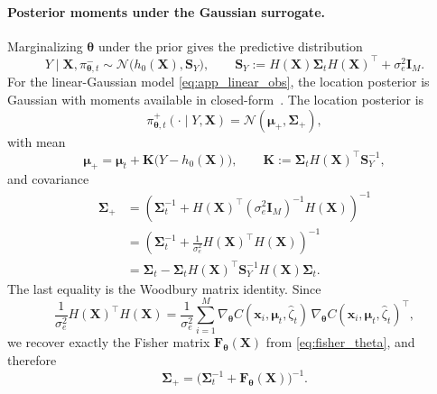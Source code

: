 \documentclass{article}
\newcommand{\bs}[1]{\boldsymbol{#1}}
\newcommand{\x}{\mathbf{x}}
\newcommand{\bX}{\mathbf{X}}
\begin{document}
\paragraph{Posterior moments under the Gaussian surrogate.}
Marginalizing $\bs\theta$ under the prior gives the predictive distribution
\begin{equation}
Y\mid\bX,\pi_{\bs\theta,t}^-
\sim\mathcal N\!\bigl(h_0(\bX),\bs S_Y\bigr),
\qquad
\bs S_Y:=H(\bX)\bs\Sigma_tH(\bX)^\top+\sigma_e^2\bs I_M.
\end{equation}
For the linear-Gaussian model \eqref{eq:app_linear_obs}, the location posterior is Gaussian with moments available in closed-form~\cite{kaipio2005statistical}.
The location posterior is
\begin{equation}
\pi_{\bs\theta,t}^+(\cdot\mid Y,\bX)
=\mathcal N(\bs\mu_+,\bs\Sigma_+),
\end{equation}
with mean
\begin{equation}
\label{eq:app_post_mean}
\bs\mu_+
=\bs\mu_t+\bs K\bigl(Y-h_0(\bX)\bigr),
\qquad
\bs K:=\bs\Sigma_tH(\bX)^\top\bs S_Y^{-1},
\end{equation}
and covariance
\begin{equation}
\label{eq:app_post_cov}
\begin{aligned}
\bs\Sigma_+
&=
\left(
\bs\Sigma_t^{-1} + H(\bX)^\top (\sigma_e^2 \bs I_M)^{-1} H(\bX)
\right)^{-1}
\\
&=
\left(
\bs\Sigma_t^{-1}+\frac{1}{\sigma_e^2}H(\bX)^\top H(\bX)
\right)^{-1}
\\
&=
\bs\Sigma_t-
\bs\Sigma_tH(\bX)^\top\bs S_Y^{-1}H(\bX)\bs\Sigma_t.
\end{aligned}
\end{equation}
The last equality is the Woodbury matrix identity.
Since
\begin{equation}
\frac{1}{\sigma_e^2}H(\bX)^\top H(\bX)
=
\frac{1}{\sigma_e^2}\sum_{i=1}^M
\nabla_{\bs\theta}C(\x_i,\bs\mu_t,\hat\zeta_t)\,
\nabla_{\bs\theta}C(\x_i,\bs\mu_t,\hat\zeta_t)^\top,
\end{equation}
we recover exactly the Fisher matrix $\bs F_{\bs\theta}(\bX)$ from \eqref{eq:fisher_theta}, and therefore
\begin{equation}
\label{eq:app_post_cov_fisher}
\bs\Sigma_+ = \bigl(\bs\Sigma_t^{-1}+\bs F_{\bs\theta}(\bX)\bigr)^{-1}.
\end{equation}
\end{document}
